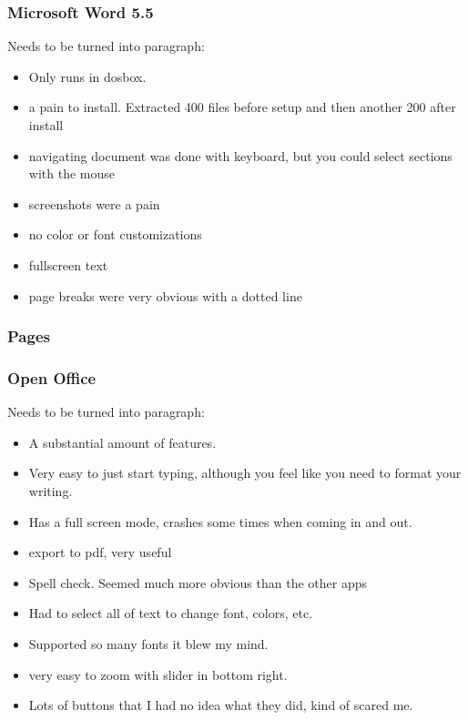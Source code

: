 \documentclass[11pt]{article}
\begin{document}
\subsubsection{Microsoft Word 5.5}

Needs to be turned into paragraph:

\begin{itemize}
\item Only runs in dosbox.
\item a pain to install. Extracted 400 files before setup and then another 200 after install
\item navigating document was done with keyboard, but you could select sections with the mouse
\item screenshots were a pain
\item no color or font customizations
\item fullscreen text
\item page breaks were very obvious with a dotted line
\end{itemize}

\subsubsection{Pages}


\subsubsection{Open Office}

Needs to be turned into paragraph:

\begin{itemize}
\item A substantial amount of features.
\item Very easy to just start typing, although you feel like you need to format your writing.
\item Has a full screen mode, crashes some times when coming in and out.
\item export to pdf, very useful
\item Spell check. Seemed much more obvious than the other apps
\item Had to select all of text to change font, colors, etc.
\item Supported so many fonts it blew my mind.
\item very easy to zoom with slider in bottom right.
\item Lots of buttons that I had no idea what they did, kind of scared me.
\end{itemize}
\end{document}
